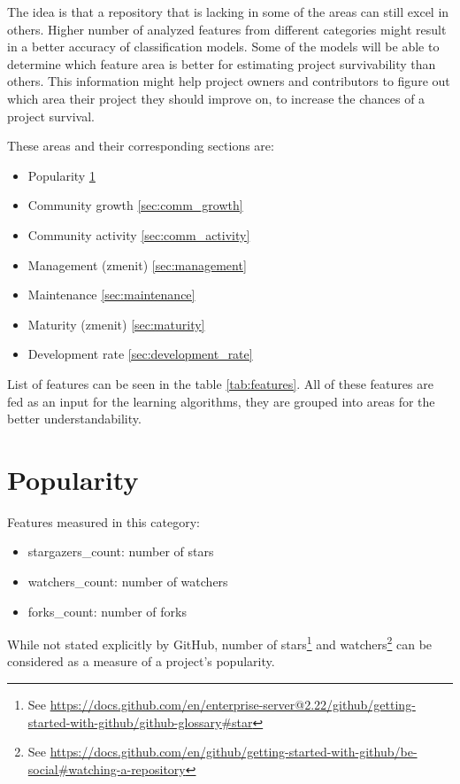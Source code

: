 The idea is that a repository that is lacking in some of the areas can still excel in others.
Higher number of analyzed features from different categories might result in a better accuracy of classification models.
Some of the models will be able to determine which feature area is better for estimating project survivability than others.
This information might help project owners and contributors to figure out which area their project they should improve on, to increase the chances of a project survival.

These areas and their corresponding sections are:

\begin{itemize}
    \item Popularity \ref{sec:popularity}
    \item Community growth \ref{sec:comm_growth}
    \item Community activity \ref{sec:comm_activity}
    \item Management (zmenit) \ref{sec:management}
    \item Maintenance \ref{sec:maintenance}
    \item Maturity (zmenit) \ref{sec:maturity}
    \item Development rate \ref{sec:development_rate}
\end{itemize}

List of features can be seen in the table \ref{tab:features}.
All of these features are fed as an input for the learning algorithms, they are grouped into areas for the better understandability.

\section{Popularity}
\label{sec:popularity}

Features measured in this category:

\begin{itemize}
    \item stargazers\_count: number of stars
    \item watchers\_count: number of watchers
    \item forks\_count: number of forks
\end{itemize}

While not stated explicitly by GitHub, number of stars\footnote{See \url{https://docs.github.com/en/enterprise-server@2.22/github/getting-started-with-github/github-glossary\#star}} and watchers\footnote{See \url{https://docs.github.com/en/github/getting-started-with-github/be-social\#watching-a-repository}} can be considered as a measure of a project's popularity.

